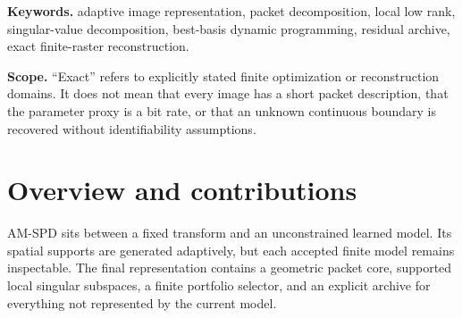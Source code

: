 \documentclass[11pt]{article}
\theoremstyle{definition}
\theoremstyle{remark}
\newcommand{\Callout}[2][PaleBlue]{\noindent\colorbox{#1}{\parbox{0.965\linewidth}{\vspace{3pt}#2\vspace{3pt}}}}
\begin{document}
\begin{abstract}
Adaptive Multiscale Singular Packet Decomposition (AM-SPD) combines geometry-dependent supports, local low-rank models, exact finite-tree budget optimization, and a residual archive. A generative packet atlas proposes supports from segmentations, contours, dyadic cells, and residual-driven refinements. On each support, truncated singular-value models select orientation and rank. An integer-budget dynamic program returns the minimum additive squared error for every budget on a declared finite tree. The retained directions are then refitted globally, which cannot increase least-squares error. A finite portfolio of greedy, Lagrange-tree, and exact-budget seeds, together with backward replacement candidates, yields nonregression over the completed candidates. The identity $F=\widehat F+R_{\mathrm{archive}}$ preserves exact accounting without conflating lossless closure with sparse modeling. Four principal images and a ten-image stress suite show strong gains in several structured and natural-image cases, but no universal advantage over global SVD. A 36-scenario noise study likewise shows that the deterministic objective is not automatically a denoiser. The implementation suite evaluates $12{,}154$ cases, including $9{,}960$ exhaustive checks of the tree recursion. All optimality claims are restricted to the declared supports, candidate families, budgets, costs, and objective.
\end{abstract}

\textbf{Keywords.} adaptive image representation, packet decomposition, local low rank, singular-value decomposition, best-basis dynamic programming, residual archive, exact finite-raster reconstruction.

\Callout[PaleOrange]{\textbf{Scope.} ``Exact'' refers to explicitly stated finite optimization or reconstruction domains. It does not mean that every image has a short packet description, that the parameter proxy is a bit rate, or that an unknown continuous boundary is recovered without identifiability assumptions.}

\section*{Overview and contributions}
AM-SPD sits between a fixed transform and an unconstrained learned model. Its spatial supports are generated adaptively, but each accepted finite model remains inspectable. The final representation contains a geometric packet core, supported local singular subspaces, a finite portfolio selector, and an explicit archive for everything not represented by the current model.
\end{document}
